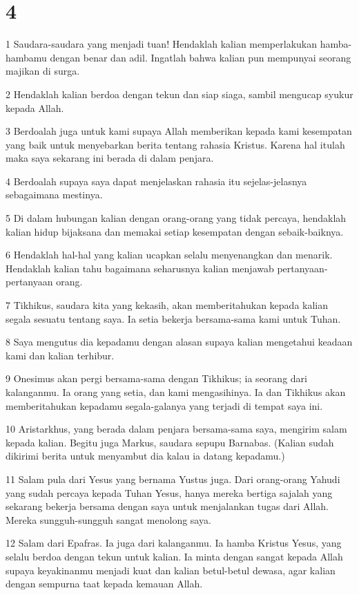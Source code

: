 \chapter{4}

\par 1 Saudara-saudara yang menjadi tuan! Hendaklah kalian memperlakukan hamba-hambamu dengan benar dan adil. Ingatlah bahwa kalian pun mempunyai seorang majikan di surga.
\par 2 Hendaklah kalian berdoa dengan tekun dan siap siaga, sambil mengucap syukur kepada Allah.
\par 3 Berdoalah juga untuk kami supaya Allah memberikan kepada kami kesempatan yang baik untuk menyebarkan berita tentang rahasia Kristus. Karena hal itulah maka saya sekarang ini berada di dalam penjara.
\par 4 Berdoalah supaya saya dapat menjelaskan rahasia itu sejelas-jelasnya sebagaimana mestinya.
\par 5 Di dalam hubungan kalian dengan orang-orang yang tidak percaya, hendaklah kalian hidup bijaksana dan memakai setiap kesempatan dengan sebaik-baiknya.
\par 6 Hendaklah hal-hal yang kalian ucapkan selalu menyenangkan dan menarik. Hendaklah kalian tahu bagaimana seharusnya kalian menjawab pertanyaan-pertanyaan orang.
\par 7 Tikhikus, saudara kita yang kekasih, akan memberitahukan kepada kalian segala sesuatu tentang saya. Ia setia bekerja bersama-sama kami untuk Tuhan.
\par 8 Saya mengutus dia kepadamu dengan alasan supaya kalian mengetahui keadaan kami dan kalian terhibur.
\par 9 Onesimus akan pergi bersama-sama dengan Tikhikus; ia seorang dari kalanganmu. Ia orang yang setia, dan kami mengasihinya. Ia dan Tikhikus akan memberitahukan kepadamu segala-galanya yang terjadi di tempat saya ini.
\par 10 Aristarkhus, yang berada dalam penjara bersama-sama saya, mengirim salam kepada kalian. Begitu juga Markus, saudara sepupu Barnabas. (Kalian sudah dikirimi berita untuk menyambut dia kalau ia datang kepadamu.)
\par 11 Salam pula dari Yesus yang bernama Yustus juga. Dari orang-orang Yahudi yang sudah percaya kepada Tuhan Yesus, hanya mereka bertiga sajalah yang sekarang bekerja bersama dengan saya untuk menjalankan tugas dari Allah. Mereka sungguh-sungguh sangat menolong saya.
\par 12 Salam dari Epafras. Ia juga dari kalanganmu. Ia hamba Kristus Yesus, yang selalu berdoa dengan tekun untuk kalian. Ia minta dengan sangat kepada Allah supaya keyakinanmu menjadi kuat dan kalian betul-betul dewasa, agar kalian dengan sempurna taat kepada kemauan Allah.
